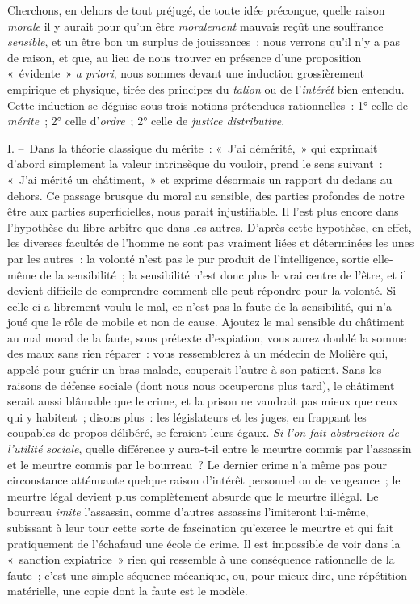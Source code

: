 \documentclass[french,twoside]{book} %
\begin{document}
Cherchons, en dehors de tout préjugé, de toute idée préconçue, quelle raison \emph{morale} il y aurait pour qu’un être \emph{moralement} mauvais reçût une souffrance \emph{sensible}, et un être bon un surplus de jouissances ; nous verrons qu’il n’y a pas de raison, et que, au lieu de nous trouver en présence d’une proposition « évidente » \emph{a priori}, nous sommes devant une induction grossièrement empirique et physique, tirée des principes du \emph{talion} ou de l’\emph{intérêt} bien entendu. Cette induction se déguise sous trois notions prétendues rationnelles : 1° celle de \emph{mérite} ; 2° celle d’\emph{ordre} ; 2° celle de \emph{justice distributive}.\par
I. – Dans la théorie classique du mérite : « J’ai démérité, » qui exprimait d’abord simplement la valeur intrinsèque du vouloir, prend le sens suivant : « J’ai mérité un châtiment, » et exprime désormais un rapport du dedans au dehors. Ce passage brusque du moral au sensible, des parties profondes de notre être aux parties superficielles, nous parait injustifiable. Il l’est plus encore dans l’hypothèse du libre arbitre que dans les autres. D’après cette hypothèse, en effet, les diverses facultés de l’homme ne sont pas vraiment liées et déterminées les unes par les autres : la volonté n’est pas le pur produit de l’intelligence, sortie elle-même de la sensibilité ; la sensibilité n’est donc plus le vrai centre de l’être, et il devient difficile de comprendre comment elle peut répondre pour la volonté. Si celle-ci a librement voulu le mal, ce n’est pas la faute de la sensibilité, qui n’a joué que le rôle de mobile et non de cause. Ajoutez le mal sensible du châtiment au mal moral de la faute, sous prétexte d’expiation, vous aurez doublé la somme des maux sans rien réparer : vous ressemblerez à un médecin de Molière qui, appelé pour guérir un bras malade, couperait l’autre à son patient. Sans les raisons de défense sociale (dont nous nous occuperons plus tard), le châtiment serait aussi blâmable que le crime, et la prison ne vaudrait pas mieux que ceux qui y habitent ; disons plus : les législateurs et les juges, en frappant les coupables de propos délibéré, se feraient leurs égaux. \emph{Si l’on fait abstraction de l’utilité sociale}, quelle différence y aura-t-il entre le meurtre commis par l’assassin et le meurtre commis par le bourreau ? Le dernier crime n’a même pas pour circonstance atténuante quelque raison d’intérêt personnel ou de vengeance ; le meurtre légal devient plus complètement absurde que le meurtre illégal. Le bourreau \emph{imite} l’assassin, comme d’autres assassins l’imiteront lui-même, subissant à leur tour cette sorte de fascination qu’exerce le meurtre et qui fait pratiquement de l’échafaud une école de crime. Il est impossible de voir dans la « sanction expiatrice » rien qui ressemble à une conséquence rationnelle de la faute ; c’est une simple séquence mécanique, ou, pour mieux dire, une répétition matérielle, une copie dont la faute est le modèle.\par
\end{document}
